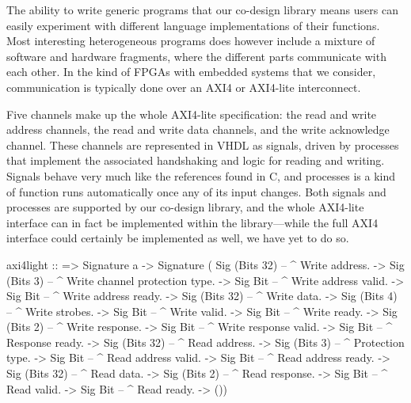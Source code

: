 \documentclass[../main.tex]{subfiles}
\begin{document}
The ability to write generic programs that our co-design library means users can easily experiment with different language implementations of their functions. Most interesting heterogeneous programs does however include a mixture of software and hardware fragments, where the different parts communicate with each other. In the kind of FPGAs with embedded systems that we consider, communication is typically done over an AXI4 or AXI4-lite interconnect. 


Five channels make up the whole AXI4-lite specification: the read and write address channels, the read and write data channels, and the write acknowledge channel. These channels are represented in VHDL as signals, driven by processes that implement the associated handshaking and logic for reading and writing. Signals behave very much like the references found in C, and processes is a kind of function runs automatically once any of its input changes. Both signals and processes are supported by our co-design library, and the whole AXI4-lite interface can in fact be implemented within the library---while the full AXI4 interface could certainly be implemented as well, we have yet to do so.

\begin{code}
axi4light ::
  => Signature a
  -> Signature (
          Sig (Bits 32) -- ^ Write address.
       -> Sig (Bits 3)  -- ^ Write channel protection type.
       -> Sig Bit       -- ^ Write address valid.
       -> Sig Bit       -- ^ Write address ready.
       -> Sig (Bits 32) -- ^ Write data.
       -> Sig (Bits 4)  -- ^ Write strobes.
       -> Sig Bit       -- ^ Write valid.
       -> Sig Bit       -- ^ Write ready.
       -> Sig (Bits 2)  -- ^ Write response.
       -> Sig Bit       -- ^ Write response valid.
       -> Sig Bit       -- ^ Response ready.
       -> Sig (Bits 32) -- ^ Read address.
       -> Sig (Bits 3)  -- ^ Protection type.
       -> Sig Bit       -- ^ Read address valid.
       -> Sig Bit       -- ^ Read address ready.
       -> Sig (Bits 32) -- ^ Read data.
       -> Sig (Bits 2)  -- ^ Read response.
       -> Sig Bit       -- ^ Read valid.
       -> Sig Bit       -- ^ Read ready.    
       -> ())
\end{code}
\end{document}
